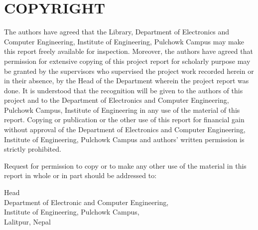 \newpage
\section*{COPYRIGHT}
The authors have agreed that the Library, Department of Electronics and Computer Engineering, Institute of Engineering, Pulchowk
Campus may make this report freely available for inspection. Moreover, the authors have agreed that permission for extensive
copying of this project report for scholarly purpose may be granted by the supervisors who supervised the project work recorded 
herein or in their absence, by the Head of the Department wherein the project report was done. It is understood that the 
recognition will be given to the authors of this project and to the Department of Electronics and Computer Engineering, Pulchowk
Campus, Institute of Engineering in any use of the material of this report. Copying or publication or the other use of this report
for financial gain without approval of the Department of Electronics and Computer Engineering, Institute of Engineering, Pulchowk
Campus and authors' written permission is strictly prohibited.

Request for permission to copy or to make any other use of the material in this report in whole or in part should be 
addressed to:

Head\\
Department of Electronic and Computer Engineering,\\
Institute of Engineering, Pulchowk Campus, \\ 
Lalitpur, Nepal 

